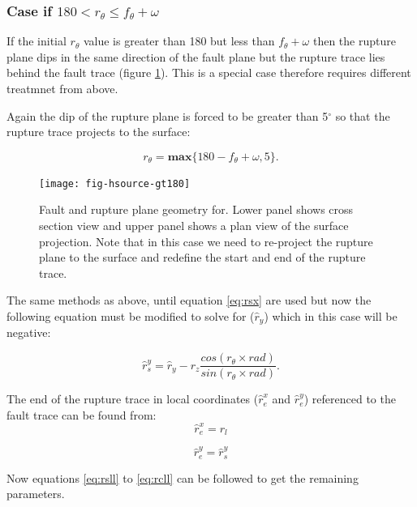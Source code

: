 \subsubsection{Case if  $180 <  r_\theta \leq f_\theta + \omega$} \label{sec:180to270}

If the initial $r_\theta$ value is greater than 180 but less than $f_\theta + \omega$ then the rupture 
plane dips in the same direction of the fault plane but the rupture trace lies behind the fault trace (figure \ref{fig:gt180}). This is a special case therefore requires different
treatmnet from above.

Again the dip of the rupture plane is forced to be greater than 5$^\circ$ so 
that the rupture trace projects to the surface:

\begin{equation}
r_\theta = \mathbf{max} \{ 180 - f_\theta + \omega, 5 \} .
\end{equation}

\begin{figure}[htp]
\centerline{\texttt{[image: fig-hsource-gt180]}}
\caption{Fault and rupture plane geometry for. Lower panel shows cross section view and upper panel shows 
a plan view of the surface projection. Note that in this case we need to re-project the rupture plane to 
the surface and redefine the start and end of the rupture trace.}
\label{fig:gt180}
\end{figure}

The same methods as above, until equation \ref{eq:rsx} are used but now the following equation must be modified
to solve for ($\hat{r}_y$) which in this case will be negative:

\begin{equation}\label{eq:ry4}
\hat{r}_s^y = \hat{r}_y -  r_z  \frac{cos(r_\theta  \times rad)}{sin(r_\theta \times rad)}.
\end{equation}

The end of the rupture trace in local coordinates ($\hat{r}_e^x$ and $\hat{r}_e^y$) referenced to the fault 
trace can be found from:
\begin{equation}
\hat{r}_e^x = r_l
\end{equation}

\begin{equation}
\hat{r}_e^y = \hat{r}_s^y
\end{equation}

Now equations \ref{eq:rsll} to \ref{eq:rcll} can be followed to get the remaining parameters.


